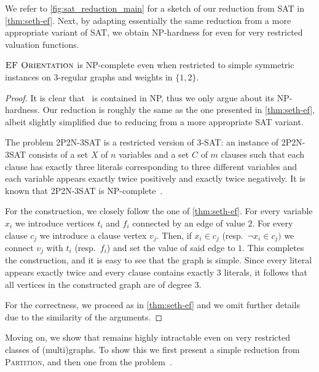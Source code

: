 We refer to \cref{fig:sat_reduction_main} for a sketch of our reduction from SAT in \cref{thm:seth-ef}.
Next, by adapting essentially the same reduction from a more appropriate variant of SAT, we obtain NP-hardness for {\EFo}
even for very restricted valuation functions.


\begin{theoremrep}[\appsymb]\label{thm:npc-ef}
    $\textup{\textsc{EF Orientation}}$ is NP-complete even when restricted to simple symmetric instances on $3$-regular graphs and weights in $\{1,2\}$.
\end{theoremrep}


\begin{proof}
    It is clear that \EFo\ is contained in NP, thus we only argue about its NP-hardness.
    Our reduction is roughly the same as the one presented in \cref{thm:seth-ef},
    albeit slightly simplified due to reducing from a more appropriate SAT variant.

    The problem 2P2N-3SAT is a restricted version of 3-SAT:
    an instance of 2P2N-3SAT consists of a set $X$ of $n$ variables and a set $C$ of $m$ clauses such that
    each clause has exactly three literals corresponding to three different variables
    and each variable appears exactly twice positively and exactly twice negatively.
    It is known that 2P2N-3SAT is NP-complete~\cite{eccc/ECCC-TR03-049,dam/DarmannD21}.

    For the construction, we closely follow the one of \cref{thm:seth-ef}.
    For every variable $x_i$ we introduce vertices $t_i$ and $f_i$ connected by an edge of value $2$.
    For every clause $c_j$ we introduce a clause vertex $v_j$.
    Then, if $x_i \in c_j$ (resp.~$\neg x_i \in c_j)$
    we connect $v_j$ with $t_i$ (resp.~$f_i$) and set the value of said edge to $1$.
    This completes the construction, and it is easy to see that the graph is simple.
    Since every literal appears exactly twice and every clause contains exactly $3$ literals,
    it follows that all vertices in the constructed graph are of degree $3$.

    For the correctness, we proceed as in \cref{thm:seth-ef} and we omit further details due to the
    similarity of the arguments.
\end{proof}

Moving on, we show that {\EFo} remains highly intractable even on very restricted classes of (multi)graphs.
To show this we first present a simple reduction from \textsc{Partition},
and then one from the {\TOO} problem~\cite{wg/BodlaenderCW22,dam/BodlaenderS26}.



